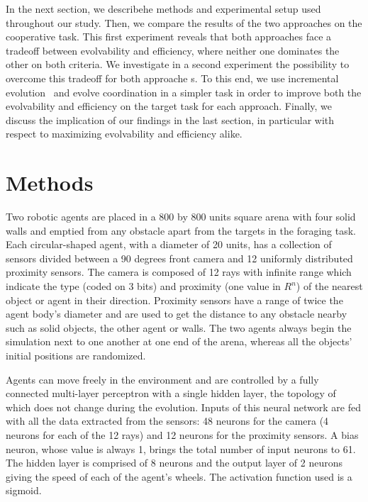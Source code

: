   In the next section, we describehe methods and experimental setup used throughout our study. Then, we compare the results of the two approaches on the cooperative task. This first experiment reveals that both approaches face a tradeoff between evolvability and efficiency, where neither one dominates the other on both criteria. We investigate in a second experiment the possibility to overcome this tradeoff for both approache s. To this end, we use incremental evolution~\parencite{Harvey1994, Urzelai1998} and evolve coordination in a simpler task in order to improve both the evolvability and efficiency on the target task for each approach. Finally, we discuss the implication of our findings in the last section, in particular with respect to maximizing evolvability and efficiency alike.


\section{Methods}
  

  Two robotic agents are placed in a 800 by 800 units square arena with four solid walls and emptied from any obstacle apart from the targets in the foraging task. Each circular-shaped agent, with a diameter of 20 units, has a collection of sensors divided between a 90 degrees front camera and 12 uniformly distributed proximity sensors. The camera is composed of 12 rays with infinite range which indicate the type (coded on 3 bits) and proximity (one value in $R^n$) of the nearest object or agent in their direction. Proximity sensors have a range of twice the agent body's diameter and are used to get the distance to any obstacle nearby such as solid objects, the other agent or walls. The two agents always begin the simulation next to one another at one end of the arena, whereas all the objects' initial positions are randomized.

  Agents can move freely in the environment and are controlled by a fully connected multi-layer perceptron with a single hidden layer, the topology of which does not change during the evolution. Inputs of this neural network are fed with all the data extracted from the sensors: 48 neurons for the camera (4 neurons for each of the 12 rays) and 12 neurons for the proximity sensors. A bias neuron, whose value is always 1, brings the total number of input neurons to 61. The hidden layer is comprised of 8 neurons and the output layer of 2 neurons giving the speed of each of the agent's wheels. The activation function used is a sigmoid.

